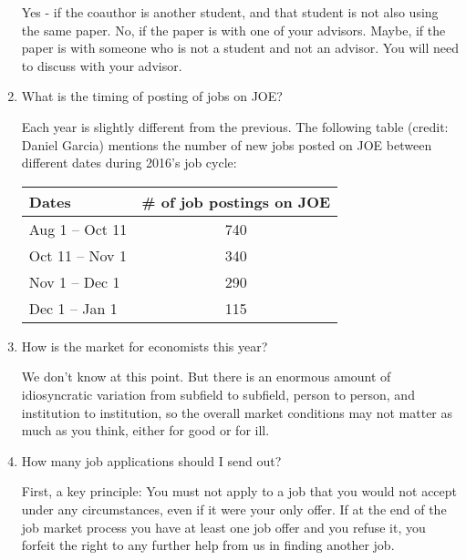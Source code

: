 \documentclass{econtex}
\begin{document}
\begin{enumerate}
  Yes - if the coauthor is another student, and that student is not
  also using the same paper.  No, if the paper is with one of your
  advisors.  Maybe, if the paper is with someone who is not a student
and not an advisor.  You will need to discuss with your advisor.

\item What is the timing of posting of jobs on JOE?

  Each year is slightly different from the previous. The following table (credit: Daniel Garcia) 
  mentions the number of new jobs posted on JOE between different dates 
  during 2016's job cycle:\\
  
  \begin{table}[]
\centering
\begin{tabular}{|l|c|}
\hline
Dates                   & \# of job postings on JOE \\ \hline
Aug 1 -- Oct 11   & 740                       \\ \hline
Oct 11 -- Nov 1 & 340                       \\ \hline
Nov 1 -- Dec 1 & 290                       \\ \hline
Dec 1 -- Jan 1  & 115                       \\ \hline
\end{tabular}
\end{table}

\item How is the market for economists this year?

We don't know at this point.  But there is an enormous amount of idiosyncratic
variation from subfield to subfield, person to person, and institution to
institution, so the overall market conditions may not matter as much
as you think, either for good or for ill.

\item {} 
How many job applications should I send out?

First, a key principle: You must not apply to a job that you would not
accept under any circumstances, even if it were your only offer.  If
at the end of the job market process you have at least one job offer
and you refuse it, you forfeit the right to any further help from us
in finding another job.  %


\end{enumerate}
\end{document}
